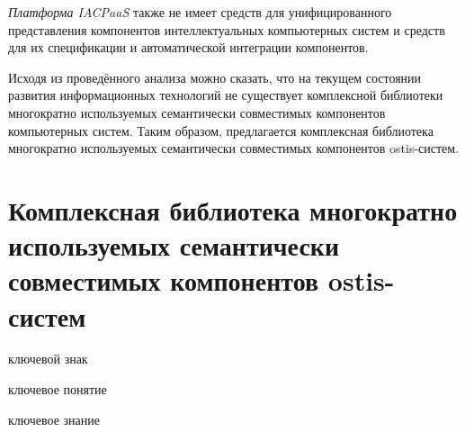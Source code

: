 \textit{Платформа IACPaaS} также не имеет средств для унифицированного представления компонентов интеллектуальных компьютерных систем и средств для их спецификации и автоматической интеграции компонентов.

Исходя из проведённого анализа можно сказать, что на текущем состоянии развития информационных технологий не существует комплексной библиотеки многократно используемых семантически совместимых компонентов компьютерных систем. Таким образом, предлагается комплексная библиотека многократно используемых семантически совместимых компонентов ostis-систем.

\section{Комплексная библиотека многократно используемых семантически совместимых компонентов ostis-систем}
\label{ostis_library_section}

\begin{SCn}
\begin{scnrelfromlist}{ключевой знак}
\end{scnrelfromlist}
\end{SCn}

\begin{SCn}
\begin{scnrelfromlist}{ключевое понятие}
\end{scnrelfromlist}
\end{SCn}

\begin{SCn}
\begin{scnrelfromlist}{ключевое знание}
\end{scnrelfromlist}
\end{SCn}

\bigskip

